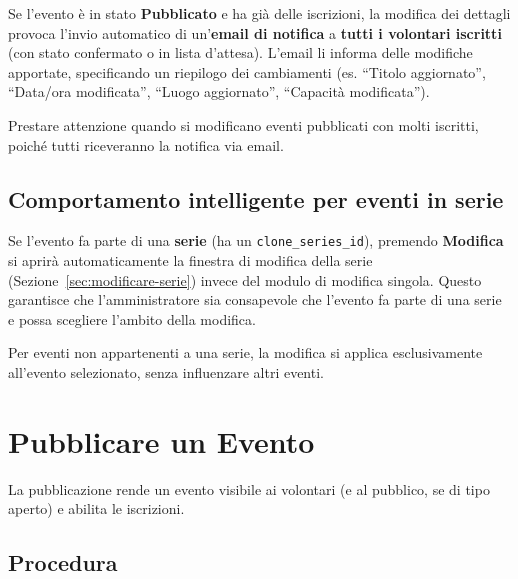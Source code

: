 \documentclass[a4paper,11pt,oneside]{book}
\newcommand{\menuitem}[1]{\textsf{\textbf{#1}}}
\newcommand{\campo}[1]{\texttt{#1}}
\begin{document}
\begin{warningbox}
Se l'evento \`e in stato \textbf{Pubblicato} e ha gi\`a delle iscrizioni, la modifica dei dettagli provoca l'invio automatico di un'\textbf{email di notifica} a \textbf{tutti i volontari iscritti} (con stato confermato o in lista d'attesa). L'email li informa delle modifiche apportate, specificando un riepilogo dei cambiamenti (es. ``Titolo aggiornato'', ``Data/ora modificata'', ``Luogo aggiornato'', ``Capacit\`a modificata'').

Prestare attenzione quando si modificano eventi pubblicati con molti iscritti, poich\'e tutti riceveranno la notifica via email.
\end{warningbox}

\subsection{Comportamento intelligente per eventi in serie}

Se l'evento fa parte di una \textbf{serie} (ha un \campo{clone\_series\_id}), premendo \menuitem{Modifica} si aprir\`a automaticamente la finestra di modifica della serie (Sezione~\ref{sec:modificare-serie}) invece del modulo di modifica singola. Questo garantisce che l'amministratore sia consapevole che l'evento fa parte di una serie e possa scegliere l'ambito della modifica.

\begin{tipbox}
Per eventi non appartenenti a una serie, la modifica si applica esclusivamente all'evento selezionato, senza influenzare altri eventi.
\end{tipbox}

\section{Pubblicare un Evento}
\label{sec:pubblicare-evento}

La pubblicazione rende un evento visibile ai volontari (e al pubblico, se di tipo aperto) e abilita le iscrizioni.

\subsection{Procedura}
\end{document}
